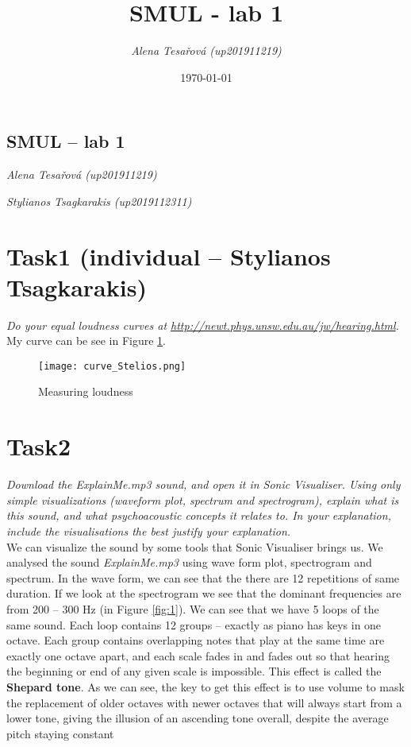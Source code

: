 \documentclass[11pt,a4paper]{article}
\title{SMUL - lab 1}
\author{\textit{Alena Tesařová (up201911219)} }
\date{\today}
\begin{document}
\begin{center}
\section*{SMUL -- lab 1}
\textit{Alena Tesařová (up201911219)}

\textit{Stylianos Tsagkarakis (up2019112311)}
\end{center}{}

\section{Task1 (individual -- Stylianos Tsagkarakis)}
\textit{Do your equal loudness curves at \url{http://newt.phys.unsw.edu.au/jw/hearing.html}.}\\
My curve can be see in Figure \ref{fig:loud}.
\begin{figure}[!htb]
     \centering
     \texttt{[image: curve\_Stelios.png]}
     \caption{Measuring loudness}
     \label{fig:loud}
\end{figure}

\section{Task2}
\textit{Download the \textit{ExplainMe.mp3} sound, and open it in Sonic Visualiser. Using only simple visualizations (waveform plot, spectrum and spectrogram), explain what is this sound, and what psychoacoustic concepts it relates to. In your explanation, include the visualisations the best justify your explanation.} \\ 

We can visualize the sound by some tools that Sonic Visualiser brings us. We analysed the sound \textit{ExplainMe.mp3} using wave form plot, spectrogram and spectrum. In the wave form, we can see that the there are 12 repetitions of same duration. If we look at the spectrogram we see that the dominant frequencies are from 200 -- 300 Hz (in Figure \ref{fig:1}). We can see that we have 5 loops of the same sound. Each loop contains 12 groups -- exactly as piano has keys in one octave. Each group contains overlapping notes that play at the same time are exactly one octave apart, and each scale fades in and fades out so that hearing the beginning or end of any given scale is impossible. This effect is called the \textbf{Shepard tone}. As we can see, the key to get this effect is to use volume to mask the replacement of older octaves with newer octaves that will always start from a lower tone, giving the illusion of an ascending tone overall, despite the average pitch staying constant
\end{document}
